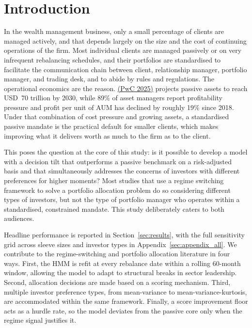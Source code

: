 \documentclass[11pt, a4paper]{article}
\newcommand{\cit}[2]{\hyperlink{ref:#1}{\textcolor{elsblue}{#2}}}
\begin{document}
\section{Introduction}

In the wealth management business, only a small percentage of clients are managed actively, and
that depends largely on the size and the cost of continuing operations of the firm. Most
individual clients are managed passively or on very infrequent rebalancing schedules, and their
portfolios are standardised to facilitate the communication chain between client, relationship
manager, portfolio manager, and trading desk, and to abide by rules and regulations. The
operational economics are the reason. \cit{pwc2025}{(PwC 2025)} projects passive assets to reach USD~70 trillion by
2030, while 89\% of asset managers report profitability pressure and profit per unit of AUM has
declined by roughly 19\% since 2018. Under that combination of cost pressure and growing
assets, a standardised passive mandate is the practical default for smaller clients, which
makes improving what it delivers worth as much to the firm as to the client.

This poses the question at the core of this study: is it possible to develop a model with a
decision tilt that outperforms a passive benchmark on a risk-adjusted basis and that
simultaneously addresses the concerns of investors with different preferences for higher moments?
Most studies that use a regime switching framework to solve a portfolio allocation problem do so
considering different types of investors, but not the type of portfolio manager who operates
within a standardised, constrained mandate. This study deliberately caters to both audiences.

Headline performance is reported in Section~\ref{sec:results}, with the full sensitivity grid across sleeve sizes and investor types in Appendix~\ref{sec:appendix_all}. We contribute
to the regime-switching and portfolio allocation literature in four ways. First, the HMM is
refit at every rebalance date within a rolling 60-month window, allowing the model to adapt to
structural breaks in sector leadership. Second, allocation decisions are made based on a 
scoring mechanism. Third, multiple investor preference types, from mean-variance to 
mean-variance-kurtosis, are accommodated within the same framework. Finally, a score improvement 
floor acts as a hurdle rate, so the model deviates from the passive core only when the 
regime signal justifies it.
\end{document}
